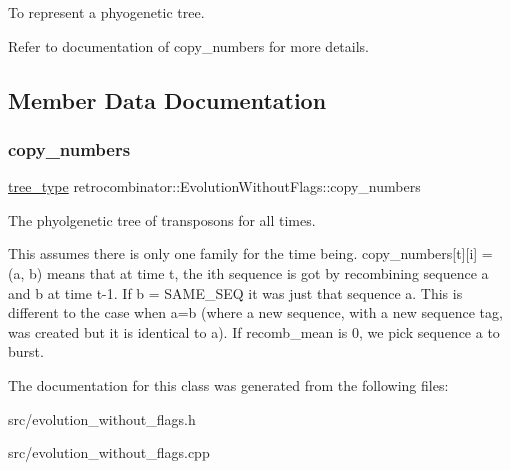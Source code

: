 To represent a phyogenetic tree. 

Refer to documentation of {\ttfamily copy\+\_\+numbers} for more details. 

\subsection{Member Data Documentation}
\mbox{\label{classretrocombinator_1_1EvolutionWithoutFlags_a912ce2bb6d33f00706bcc81379498c42}} 
\subsubsection{\texorpdfstring{copy\+\_\+numbers}{copy\_numbers}}
{\footnotesize\ttfamily \hyperlink{classretrocombinator_1_1EvolutionWithoutFlags_ac6bd9b8af2b258bf76aae5b62ef78327}{tree\+\_\+type} retrocombinator\+::\+Evolution\+Without\+Flags\+::copy\+\_\+numbers\hspace{0.3cm}{\ttfamily [private]}}



The phyolgenetic tree of transposons for all times. 

This assumes there is only one family for the time being. copy\+\_\+numbers\mbox{[}t\mbox{]}\mbox{[}i\mbox{]} = (a, b) means that at time t, the ith sequence is got by recombining sequence a and b at time t-\/1. If b = S\+A\+M\+E\+\_\+\+S\+EQ it was just that sequence a. This is different to the case when a=b (where a new sequence, with a new sequence tag, was created but it is identical to a). If recomb\+\_\+mean is 0, we pick sequence a to burst. 

The documentation for this class was generated from the following files\+:\begin{DoxyCompactItemize}
\item 
src/evolution\+\_\+without\+\_\+flags.\+h\item 
src/evolution\+\_\+without\+\_\+flags.\+cpp\end{DoxyCompactItemize}
